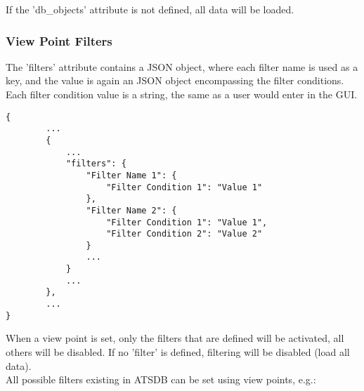 If the 'db\_objects' attribute is not defined, all data will be loaded.

\subsubsection{View Point Filters}

The 'filters' attribute contains a JSON object, where each filter name is used as a key, and the value is again an JSON object encompassing the filter conditions. Each filter condition value is a string, the same as a user would enter in the GUI.

\begin{lstlisting}[basicstyle=\small\ttfamily]
{
        ...
        {
            ...
            "filters": {
                "Filter Name 1": {
                    "Filter Condition 1": "Value 1"
                },
                "Filter Name 2": {
                    "Filter Condition 1": "Value 1",
                    "Filter Condition 2": "Value 2"
                }
                ...
            }
            ...
        },
        ...
}
\end{lstlisting}      

When a view point is set, only the filters that are defined will be activated, all others will be disabled. If no 'filter' is defined, filtering will be disabled (load all data). \\

All possible filters existing in ATSDB can be set using view points, e.g.:

